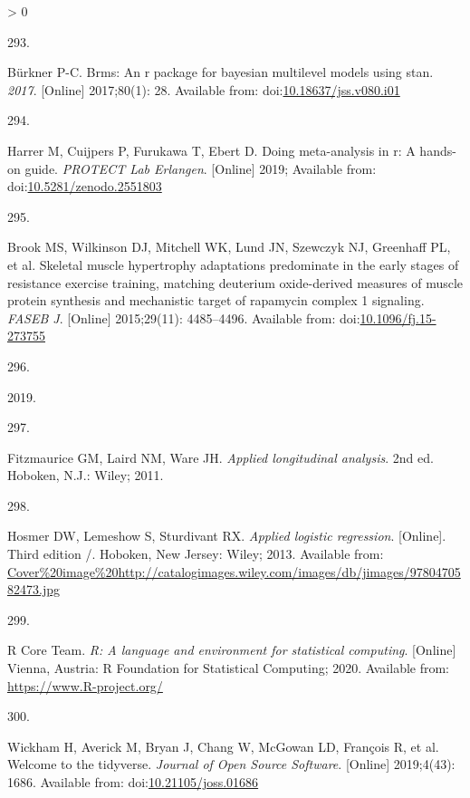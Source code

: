 \documentclass[twoside,10pt]{gihclass} %
\newlength{\cslhangindent}
\newlength{\csllabelwidth}
\newenvironment{CSLReferences}[3] %
 {%
  \setlength{\parindent}{0pt}
  \ifodd #1 \everypar{\setlength{\hangindent}{\cslhangindent}}\ignorespaces\fi
  \ifnum #2 > 0
  \setlength{\parskip}{#2\baselineskip}
  \fi
 }%
 {}
\newcommand{\CSLLeftMargin}[1]{\parbox[t]{\maxof{\widthof{#1}}{\csllabelwidth}}{#1}}
\newcommand{\CSLRightInline}[1]{\parbox[t]{\linewidth}{#1}}
\begin{document}
\begin{CSLReferences}{0}{0}
\leavevmode\hypertarget{ref-RN2562}{}%
\CSLLeftMargin{293. }
\CSLRightInline{Bürkner P-C. Brms: An r package for bayesian multilevel models using stan. \emph{2017}. {[}Online{]} 2017;80(1): 28. Available from: doi:\href{https://doi.org/10.18637/jss.v080.i01}{10.18637/jss.v080.i01}}

\leavevmode\hypertarget{ref-harrer2019doing}{}%
\CSLLeftMargin{294. }
\CSLRightInline{Harrer M, Cuijpers P, Furukawa T, Ebert D. Doing meta-analysis in r: A hands-on guide. \emph{PROTECT Lab Erlangen}. {[}Online{]} 2019; Available from: doi:\href{https://doi.org/10.5281/zenodo.2551803}{10.5281/zenodo.2551803}}

\leavevmode\hypertarget{ref-RN1642}{}%
\CSLLeftMargin{295. }
\CSLRightInline{Brook MS, Wilkinson DJ, Mitchell WK, Lund JN, Szewczyk NJ, Greenhaff PL, et al. Skeletal muscle hypertrophy adaptations predominate in the early stages of resistance exercise training, matching deuterium oxide-derived measures of muscle protein synthesis and mechanistic target of rapamycin complex 1 signaling. \emph{FASEB J}. {[}Online{]} 2015;29(11): 4485--4496. Available from: doi:\href{https://doi.org/10.1096/fj.15-273755}{10.1096/fj.15-273755}}

\leavevmode\hypertarget{ref-RN2822}{}%
\CSLLeftMargin{296. }
\CSLRightInline{2019. }

\leavevmode\hypertarget{ref-RN2332}{}%
\CSLLeftMargin{297. }
\CSLRightInline{Fitzmaurice GM, Laird NM, Ware JH. \emph{Applied longitudinal analysis}. 2nd ed. Hoboken, N.J.: Wiley; 2011. }

\leavevmode\hypertarget{ref-RN1998}{}%
\CSLLeftMargin{298. }
\CSLRightInline{Hosmer DW, Lemeshow S, Sturdivant RX. \emph{Applied logistic regression}. {[}Online{]}. Third edition /. Hoboken, New Jersey: Wiley; 2013. Available from: \url{Cover\%20image\%20http://catalogimages.wiley.com/images/db/jimages/9780470582473.jpg}}

\leavevmode\hypertarget{ref-rtats}{}%
\CSLLeftMargin{299. }
\CSLRightInline{R Core Team. \emph{R: A language and environment for statistical computing}. {[}Online{]} Vienna, Austria: R Foundation for Statistical Computing; 2020. Available from: \url{https://www.R-project.org/}}

\leavevmode\hypertarget{ref-tidyverse}{}%
\CSLLeftMargin{300. }
\CSLRightInline{Wickham H, Averick M, Bryan J, Chang W, McGowan LD, François R, et al. Welcome to the {tidyverse}. \emph{Journal of Open Source Software}. {[}Online{]} 2019;4(43): 1686. Available from: doi:\href{https://doi.org/10.21105/joss.01686}{10.21105/joss.01686}}


\end{CSLReferences}
\end{document}
